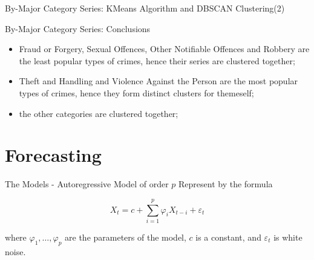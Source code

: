 \documentclass[12pt]{beamer}
\begin{document}
        \begin{frame}{By-Major Category Series: KMeans Algorithm and DBSCAN Clustering(2)}
            \begin{figure}
                \centering
            \end{figure}
        \end{frame}

        \begin{frame}{By-Major Category Series: Conclusions}
            \begin{itemize}
                \item Fraud or Forgery, Sexual Offences, Other Notifiable Offences and Robbery are the least
                popular types of crimes, hence their series are clustered together;
                \item Theft and Handling and Violence Against the Person are the most popular types of
                crimes, hence they form distinct clusters for themeself;
                \item the other categories are clustered together;
            \end{itemize}
        \end{frame}

    \section{Forecasting} %
    \label{sec:forecasting}
        \begin{frame}{The Models - Autoregressive Model of order $p$}
            Represent by the formula

            \begin{equation*}
                X_t = c + \sum_{i = 1}^{p}\varphi_iX_{t - i} + \varepsilon_t
            \end{equation*}

            where $\varphi_{1}, \ldots , \varphi_{p}$ are the parameters of the model, $c$ is a constant,
            and $\varepsilon _{t}$ is white noise.
        \end{frame}
\end{document}
